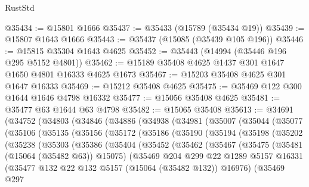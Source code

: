 \begin{lexlean}{RustStd}
\begin{coremodule}
@35434 := @15801 @1666
@35437 := @35433 (@15789 (@35434 @19))
@35439 := @15807 @1643 @1666
@35443 := @35437 (@15085 (@35439 @105 @196))
@35446 := @15815 @35304 @1643 @4625
@35452 := @35443 (@14994 (@35446 @196 @295 @5152 @4801))
@35462 := @15189 @35408 @4625 @1437 @301 @1647 @1650 @4801 @16333 @4625 @1673
@35467 := @15203 @35408 @4625 @301 @1647 @16333
@35469 := @15212 @35408 @4625
@35475 := @35469 @122 @300 @1644 @1646 @4798 @16332
@35477 := @15056 @35408 @4625
@35481 := @35477 @63 @1644 @63 @4798
@35482 := @15065 @35408
@35613 := @34691
    (@34752
      (@34803
        (@34846
          (@34886
            (@34938
              (@34981
                (@35007
                  (@35044
                    (@35077
                      (@35106
                        (@35135
                          (@35156
                            (@35172
                              (@35186
                                (@35190
                                  (@35194
                                    (@35198
                                      (@35202
                                        (@35238
                                          (@35303
                                            (@35386
                                              (@35404
                                                (@35452
                                                  (@35462
                                                    (@35467
                                                      (@35475
                                                        (@35481 (@15064 (@35482 @63)) @15075)
                                                        (@35469
                                                          @204
                                                          @299
                                                          @22
                                                          @1289
                                                          @5157
                                                          @16331
                                                          (@35477
                                                            @132
                                                            @22
                                                            @132
                                                            @5157
                                                            (@15064 (@35482 @132))
                                                            @16976)
                                                          (@35469
                                                            @297

\end{coremodule}
\end{lexlean}
